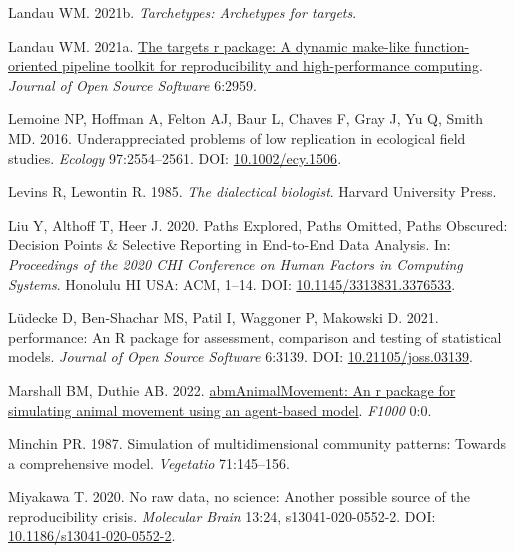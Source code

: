 \documentclass[10pt,a4paper]{article}
\newlength{\cslhangindent}
\newlength{\cslentryspacingunit} %
\newenvironment{CSLReferences}[2] %
 {%
  \setlength{\parindent}{0pt}
  \ifodd #1
  \let\oldpar\par
  \def\par{\hangindent=\cslhangindent\oldpar}
  \fi
  \setlength{\parskip}{#2\cslentryspacingunit}
 }%
 {}
\begin{document}
\begin{CSLReferences}{1}{0}
\leavevmode{}%
Landau WM. 2021b. \emph{Tarchetypes: Archetypes for targets}.

\leavevmode{}%
Landau WM. 2021a. \href{https://doi.org/10.21105/joss.02959}{The targets r package: A dynamic make-like function-oriented pipeline toolkit for reproducibility and high-performance computing}. \emph{Journal of Open Source Software} 6:2959.

\leavevmode{}%
Lemoine NP, Hoffman A, Felton AJ, Baur L, Chaves F, Gray J, Yu Q, Smith MD. 2016. Underappreciated problems of low replication in ecological field studies. \emph{Ecology} 97:2554--2561. DOI: \href{https://doi.org/10.1002/ecy.1506}{10.1002/ecy.1506}.

\leavevmode{}%
Levins R, Lewontin R. 1985. \emph{The dialectical biologist}. Harvard University Press.

\leavevmode{}%
Liu Y, Althoff T, Heer J. 2020. Paths {Explored}, {Paths} {Omitted}, {Paths} {Obscured}: {Decision} {Points} \& {Selective} {Reporting} in {End}-to-{End} {Data} {Analysis}. In: \emph{Proceedings of the 2020 {CHI} {Conference} on {Human} {Factors} in {Computing} {Systems}}. Honolulu HI USA: ACM, 1--14. DOI: \href{https://doi.org/10.1145/3313831.3376533}{10.1145/3313831.3376533}.

\leavevmode{}%
Lüdecke D, Ben-Shachar MS, Patil I, Waggoner P, Makowski D. 2021. {performance}: An {R} package for assessment, comparison and testing of statistical models. \emph{Journal of Open Source Software} 6:3139. DOI: \href{https://doi.org/10.21105/joss.03139}{10.21105/joss.03139}.

\leavevmode{}%
Marshall BM, Duthie AB. 2022. \href{https://0}{{abmAnimalMovement}: An r package for simulating animal movement using an agent-based model}. \emph{F1000} 0:0.

\leavevmode{}%
Minchin PR. 1987. Simulation of multidimensional community patterns: Towards a comprehensive model. \emph{Vegetatio} 71:145--156.

\leavevmode{}%
Miyakawa T. 2020. No raw data, no science: Another possible source of the reproducibility crisis. \emph{Molecular Brain} 13:24, s13041-020-0552-2. DOI: \href{https://doi.org/10.1186/s13041-020-0552-2}{10.1186/s13041-020-0552-2}.


\end{CSLReferences}
\end{document}
